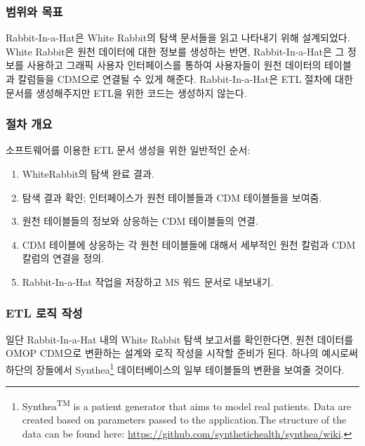 \documentclass[11pt]{book}
\providecommand{\tightlist}{%
  \setlength{\itemsep}{0pt}\setlength{\parskip}{0pt}}
\let\rmarkdownfootnote\footnote%
\def\footnote{\protect\rmarkdownfootnote}
\theoremstyle{definition}
\theoremstyle{definition}
\theoremstyle{definition}
\theoremstyle{remark}
\begin{document}
\subsubsection*{범위와 목표}\label{--1}

Rabbit-In-a-Hat은 White Rabbit의 탐색 문서들을 읽고 나타내기 위해
설계되었다. White Rabbit은 원천 데이터에 대한 정보를 생성하는 반면,
Rabbit-In-a-Hat은 그 정보를 사용하고 그래픽 사용자 인터페이스를 통하여
사용자들이 원천 데이터의 테이블과 칼럼들을 CDM으로 연결될 수 있게
해준다. Rabbit-In-a-Hat은 ETL 절차에 대한 문서를 생성해주지만 ETL을 위한
코드는 생성하지 않는다.

\subsubsection*{절차 개요}\label{--1}

소프트웨어를 이용한 ETL 문서 생성을 위한 일반적인 순서:

\begin{enumerate}
\def\labelenumi{\arabic{enumi}.}
\tightlist
\item
  WhiteRabbit의 탐색 완료 결과.
\item
  탐색 결과 확인; 인터페이스가 원천 테이블들과 CDM 테이블들을 보여줌.
\item
  원천 테이블들의 정보와 상응하는 CDM 테이블들의 연결.
\item
  CDM 테이블에 상응하는 각 원천 테이블들에 대해서 세부적인 원천 칼럼과
  CDM 칼럼의 연결을 정의.
\item
  Rabbit-In-a-Hat 작업을 저장하고 MS 워드 문서로 내보내기.
\end{enumerate}

\subsubsection*{ETL 로직 작성}\label{etl--}

일단 Rabbit-In-a-Hat 내의 White Rabbit 탐색 보고서를 확인한다면, 원천
데이터를 OMOP CDM으로 변환하는 설계와 로직 작성을 시작할 준비가 된다.
하나의 예시로써 하단의 장들에서 Synthea\footnote{Synthea\textsuperscript{TM}
  is a patient generator that aims to model real patients. Data are
  created based on parameters passed to the application.The structure of
  the data can be found here:
  \url{https://github.com/synthetichealth/synthea/wiki}.} 데이터베이스의
일부 테이블들의 변환을 보여줄 것이다.
\end{document}
